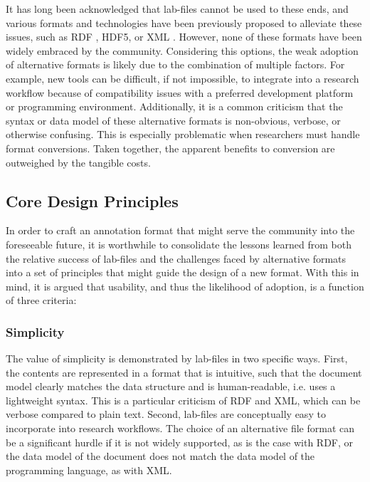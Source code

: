 \noindent It has long been acknowledged that lab-files cannot be used to these ends, and various formats and technologies have been previously proposed to alleviate these issues, such as RDF \cite{cannam2006sonic}, HDF5\cite{bertin2011million}, or XML \cite{mckay2005ace}.
However, none of these formats have been widely embraced by the community.
Considering this options, the weak adoption of alternative formats is likely due to the combination of multiple factors.
For example, new tools can be difficult, if not impossible, to integrate into a research workflow because of compatibility issues with a preferred development platform or programming environment.
Additionally, it is a common criticism that the syntax or data model of these alternative formats is non-obvious, verbose, or otherwise confusing.
This is especially problematic when researchers must handle format conversions.
Taken together, the apparent benefits to conversion are outweighed by the tangible costs.


\subsection{Core Design Principles}
\label{subsec:design}

In order to craft an annotation format that might serve the community into the foreseeable future, it is worthwhile to consolidate the lessons learned from both the relative success of lab-files and the challenges faced by alternative formats into a set of principles that might guide the design of a new format.
With this in mind, it is argued that usability, and thus the likelihood of adoption, is a function of three criteria:

\subsubsection{Simplicity}
\label{subsubsec:simplicity}
The value of simplicity is demonstrated by lab-files in two specific ways.
First, the contents are represented in a format that is intuitive, such that the document model clearly matches the data structure and is human-readable, i.e. uses a lightweight syntax.
This is a particular criticism of RDF and XML, which can be verbose compared to plain text.
Second, lab-files are conceptually easy to incorporate into research workflows.
The choice of an alternative file format can be a significant hurdle if it is not widely supported, as is the case with RDF, or the data model of the document does not match the data model of the programming language, as with XML.


